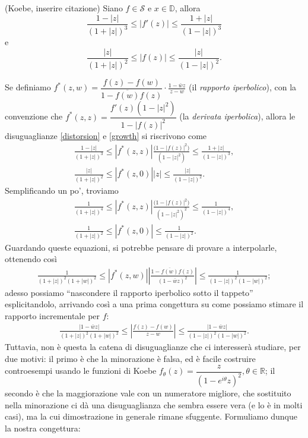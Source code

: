 \begin{thm}
  (Koebe, inserire citazione) Siano $f \in \mathcal{S}$ e $x \in \mathbb{D}$, allora
  \begin{equation}\label{distorsion}
    \frac{1-|z|}{(1+|z|)^3} \le |f'(z)| \le \frac{1+|z|}{(1-|z|)^3}
  \end{equation}
  e
  \begin{equation}\label{growth}
    \frac{|z|}{(1+|z|)^2} \le |f(z)| \le \frac{|z|}{(1-|z|)^2}.
  \end{equation}
\end{thm}
Se definiamo $f^*(z,w)=\dfrac{f(z)-f(w)}{1-\overline{f(w)}f(z)}\cdot\frac{1-\bar{w}z}{z-w}$ (il \textit{rapporto iperbolico}), con la convenzione che $f^*(z,z)=\dfrac{f'(z)(1-|z|^2)}{1-|f(z)|^2}$ (la \textit{derivata iperbolica}), allora le disuguaglianze \eqref{distorsion} e \eqref{growth} si riscrivono come
\begin{gather*}
  \frac{1-|z|}{(1+|z|)^3} \le |f^*(z,z)|\frac{\big(1-|f(z)|^2\big)}{(1-|z|^2)} \le \frac{1+|z|}{(1-|z|)^3}, \\
  \frac{|z|}{(1+|z|)^2} \le |f^*(z,0)||z| \le \frac{|z|}{(1-|z|)^2}.
\end{gather*}
Semplificando un po', troviamo
\begin{gather*}
  \frac{1}{(1+|z|)^4} \le |f^*(z,z)|\frac{\big(1-|f(z)|^2\big)}{(1-|z|^2)^2} \le \frac{1}{(1-|z|)^4}, \\
  \frac{1}{(1+|z|)^2} \le |f^*(z,0)| \le \frac{1}{(1-|z|)^2}.
\end{gather*}
Guardando queste equazioni, si potrebbe pensare di provare a interpolarle, ottenendo così
\begin{gather*}
  \frac{1}{(1+|z|)^2(1+|w|)^2} \le |f^*(z,w)| \left|\frac{1-\overline{f(w)}f(z)}{(1-\bar{w}z)^2}\right| \le \frac{1}{(1-|z|)^2(1-|w|)^2};
\end{gather*}
adesso possiamo ``nascondere il rapporto iperbolico sotto il tappeto'' esplicitandolo, arrivando così a una prima congettura su come possiamo stimare il rapporto incrementale per $f$:
\begin{gather*}
  \frac{|1-\bar{w}z|}{(1+|z|)^2(1+|w|)^2} \le \left|\frac{f(z)-f(w)}{z-w}\right| \le \frac{|1-\bar{w}z|}{(1-|z|)^2(1-|w|)^2}.
\end{gather*}
Tuttavia, non è questa la catena di disuguaglianze che ci interesserà studiare, per due motivi: il primo è che la minorazione è falsa, ed è facile costruire controesempi usando le funzioni di Koebe $f_{\theta}(z)=\dfrac{z}{(1-e^{i\theta}z)^2}, \theta \in \mathbb{R}$; il secondo è che la maggiorazione vale con un numeratore migliore, che sostituito nella minorazione ci dà una disuguaglianza che sembra essere vera (e lo è in molti casi), ma la cui dimostrazione in generale rimane sfuggente. Formuliamo dunque la nostra congettura:
